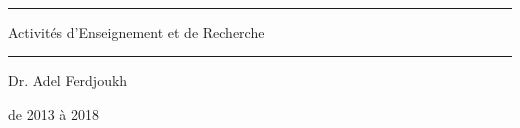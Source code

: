 




\addtolength{\tabcolsep}{-1pt}
\renewcommand{\arraystretch}{1.2}


\thispagestyle{empty}

\begin{center}
~

\vfill

\rule{12cm}{1pt}

{\Large Activités d'Enseignement et de Recherche}

\rule{4cm}{1pt}



\vspace{3mm}

Dr. Adel Ferdjoukh

\vfill

de 2013 à 2018
\end{center}



\newpage

\tableofcontents
\thispagestyle{empty}

\clearpage
\setcounter{page}{1}

\newpage







